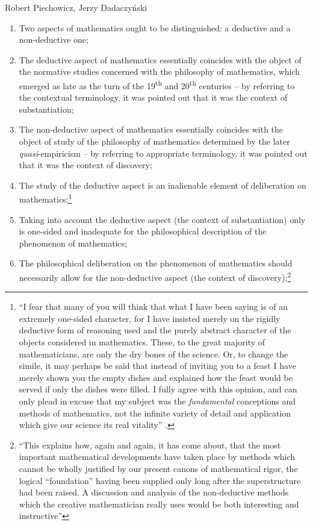 \begin{artengenv}{Robert Piechowicz, Jerzy Dadaczyński}
\begin{enumerate}
\item Two aspects of mathematics ought to be distinguished: a deductive and a non-deductive one;
\item The deductive aspect of mathematics essentially coincides with the object of the normative studies concerned with the philosophy of mathematics, which emerged as late as the turn of the 19\textsuperscript{th} and 20\textsuperscript{th} centuries -- by referring to the contextual terminology, it was pointed out that it was the context of substantiation;
\item The non-deductive aspect of mathematics essentially coincides with the object of study of the philosophy of mathematics determined by the later \textit{quasi}-empiricism -- by referring to appropriate terminology, it was pointed out that it was the context of discovery;
\item The study of the deductive aspect is an inalienable element of deliberation on mathematics;\footnote{``I fear that many of you will think that what I have been saying is of an extremely one-sided character, for I have insisted merely on the rigidly deductive form of reasoning used and the purely abstract character of the objects considered in mathematics. These, to the great majority of mathematicians, are only the dry bones of the science. Or, to change the simile, it may perhaps be said that instead of inviting you to a feast I have merely shown you the empty dishes and explained how the feast would be served if only the dishes were filled. I fully agree with this opinion, and can only plead in excuse that my subject was the \textit{fundamental} conceptions and methods of mathematics, not the infinite variety of detail and application which give our science its real vitality''
\parencite[][p.132]{bocher_fundamental_1904}.%
}
\item Taking into account the deductive aspect (the context of substantiation) only is one-sided and inadequate for the philosophical description of the phenomenon of mathematics;
\item The philosophical deliberation on the phenomenon of mathematics should necessarily allow for the non-deductive aspect (the context of discovery);\footnote{``This explains how, again and again, it has come about, that the most important mathematical developments have taken place by methods which cannot be wholly justified by our present canons of mathematical rigor, the logical ``foundation'' having been supplied only long after the superstructure had been raised. A discussion and analysis of the non-deductive methods which the creative mathematician really uses would be both interesting and instructive''
}
\end{enumerate}
\end{artengenv}
